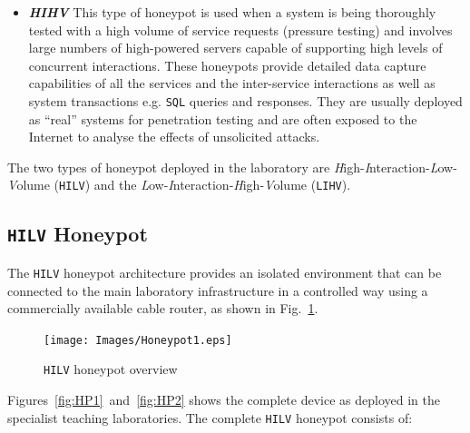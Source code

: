 \documentclass[10pt,journal]{IEEEtran}
\begin{document}
\begin{itemize}
  \item \noindent \emph{\textbf{HIHV}} This type of honeypot is used when a
    system is being thoroughly tested with a high volume of service requests
    (pressure testing) and involves large numbers of high-powered servers capable
    of supporting high levels of concurrent interactions. These honeypots
    provide detailed data capture capabilities of all the services and the
    inter-service interactions as well as system transactions e.g. \texttt{SQL}
    queries and responses. They are usually deployed as ``real'' systems for
    penetration testing and are often exposed to the Internet to analyse the
    effects of unsolicited attacks.  

\end{itemize}

The two types of honeypot deployed in the laboratory are
\emph{H}igh-\emph{I}nteraction-\emph{L}ow-\emph{V}olume (\texttt{HILV}) and the
\emph{L}ow-\emph{I}nteraction-\emph{H}igh-\emph{V}olume (\texttt{LIHV}).

\subsection{\texttt{HILV} Honeypot}

The \texttt{HILV} honeypot architecture provides an isolated environment that
can be connected to the main laboratory infrastructure in a controlled way
using a commercially available cable router, as shown in
Fig.~\ref{fig:HPOverview}.

\begin{figure}[!ht]
\begin{center}
	\texttt{[image: Images/Honeypot1.eps]}
\caption{\texttt{HILV} honeypot overview}
\label{fig:HPOverview}
\end{center}
\end{figure}

Figures~\ref{fig:HP1}~and~\ref{fig:HP2} shows the complete device as deployed
in the specialist teaching laboratories. The complete \texttt{HILV} honeypot
consists of:
\end{document}
